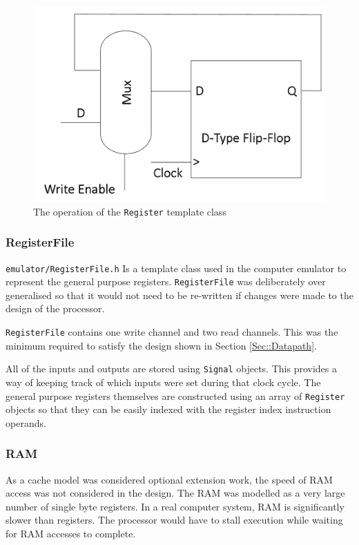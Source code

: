\documentclass[11pt,a4paper]{IEEEtran}
\begin{document}
				\begin{figure}[!h]
					\includegraphics[scale=0.35]{Register.png}
					\caption{The operation of the \texttt{Register} template class}
					\label{fig::reg}
				\end{figure}			
			
			\subsubsection{RegisterFile}
				\texttt{emulator/RegisterFile.h} Is a template class used in the computer emulator to represent the general purpose registers. \texttt{RegisterFile} was deliberately over generalised so that it would not need to be re-written if changes were made to the design of the processor. 
				
				\texttt{RegisterFile} contains one write channel and two read channels. This was the minimum required to satisfy the design shown in Section \ref{Sec::Datapath}. 
				
				All of the inputs and outputs are stored using \texttt{Signal} objects. This provides a way of keeping track of which inputs were set during that clock cycle. The general purpose registers themselves are constructed using an array of \texttt{Register} objects so that they can be easily indexed with the register index instruction operands.

			\subsubsection{RAM}
				As a cache model was considered optional extension work, the speed of RAM access was not considered in the design. The RAM was modelled as a very large number of single byte registers. In a real computer system, RAM is significantly slower than registers. The processor would have to stall execution while waiting for RAM accesses to complete. 
	
\end{document}
